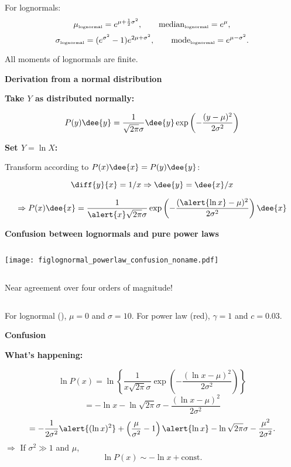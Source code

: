     For lognormals:
    $$
    \mu_{\mbox{\tiny lognormal}} = e^{\mu+\frac{1}{2}\sigma^2},
    \qquad
    \mbox{median}_{\mbox{\tiny lognormal}} = e^{\mu},
    $$
    $$
    \sigma_{\mbox{\tiny lognormal}} = (e^{\sigma^2} - 1 ) e^{2\mu + \sigma^2},
    \qquad
    \mbox{mode}_{\mbox{\tiny lognormal}} = e^{\mu-\sigma^2}.
    $$
  
    All moments of lognormals are \alert{finite}.
  
  


  \textbf{Derivation from a normal distribution}

  \textbf{Take $Y$ as distributed normally:}
    
    
      $$
      P(y)\dee{y} = \frac{1}{\sqrt{2\pi} \sigma} \dee{y}
      \exp 
      \left(
        -\frac{(y-\mu)^2}
        {2\sigma^2}
      \right)
      $$
    
  

  \textbf{Set $Y = \ln X$:}
    
     Transform according to $P(x) \dee{x} = P(y) \dee{y}$:
    
      $$
      \diff{y}{x} = 1/x \Rightarrow \dee{y} = \dee{x} / x
      $$
    
      $$
      \Rightarrow P(x) \dee{x} 
      = \frac{1}{\alert{x} \sqrt{2\pi} \sigma} 
      \exp 
      \left(
        -\frac{(\alert{\ln x}-\mu)^2}
        {2\sigma^2}
      \right)
      \dee{x}
      $$
    
  


  \textbf{Confusion between lognormals and pure power laws}

      \begin{column}{0.6\textwidth}
      \texttt{[image: figlognormal\_powerlaw\_confusion\_noname.pdf]}    
    \end{column}
    \begin{column}{0.3\textwidth}
      Near agreement over four orders of magnitude!
    \end{column}
  
  
   For lognormal (), $\mu=0$ and $\sigma=10$.
   For power law (\alert{red}), $\gamma=1$ and $c=0.03$.
  


  \textbf{Confusion}

  \textbf{What's happening:}
    
       $$
      \ln P(x) = 
      \ln 
      \left\{ 
        \frac{1}{x \sqrt{2\pi} \sigma}
        \exp 
        \left(
          -\frac{(\ln x-\mu)^2}
          {2\sigma^2}
        \right)
      \right\}
      $$
        $$
      = -\ln x  
      -\ln \sqrt{2\pi} \sigma
      -\frac{(\ln x-\mu)^2}
      {2\sigma^2}
      $$
       $$
      = 
      -\frac{1}
      {2\sigma^2}
      \alert{  (\ln x)^2}
      + \left(
        \frac{\mu}{\sigma^2} - 1
      \right)
      \alert{\ln x  }
      -\ln \sqrt{2\pi} \sigma
      -\frac{\mu^2}
      {2\sigma^2}.
      $$
     $\Rightarrow$ If $\sigma^2 \gg 1$ and $\mu$,
     $$
      \boxed{\ln P(x) \sim - \ln {x} + \mbox{const.} }
      $$

